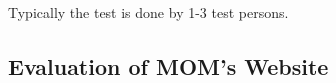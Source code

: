 Typically the test is done by 1-3 test persons\citep{HeuristicEvaluation}.

\subsection{Evaluation of MOM's Website}
